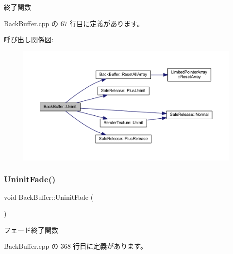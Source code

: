 終了関数 



 Back\+Buffer.\+cpp の 67 行目に定義があります。

呼び出し関係図\+:
\nopagebreak
\begin{figure}[H]
\begin{center}
\leavevmode
\includegraphics[width=350pt]{class_back_buffer_a18f0eebb58ad22bc0514edddf966eea7_cgraph}
\end{center}
\end{figure}
\mbox{\label{class_back_buffer_ad3d3626427f53f060f5057ea6a22cac6}} 
\subsubsection{\texorpdfstring{Uninit\+Fade()}{UninitFade()}}
{\footnotesize\ttfamily void Back\+Buffer\+::\+Uninit\+Fade (\begin{DoxyParamCaption}{ }\end{DoxyParamCaption})}



フェード終了関数 



 Back\+Buffer.\+cpp の 368 行目に定義があります。

